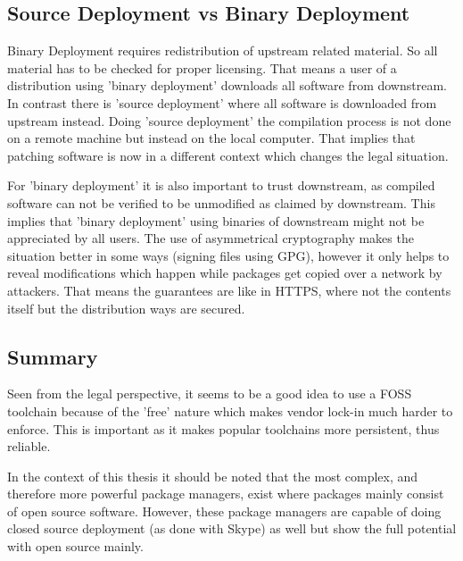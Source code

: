 \documentclass[a4paper,10pt]{article}
\begin{document}
\subsection{Source Deployment vs Binary Deployment}
Binary Deployment requires redistribution of upstream related material. So all material has to be checked for proper licensing. That means a user of a distribution using 'binary deployment' downloads all software from downstream. In contrast there is 'source deployment' where all software is downloaded from upstream instead. Doing 'source deployment' the compilation process is not done on a remote machine but instead on the local computer. That implies that patching software is now in a different context which changes the legal situation.

For 'binary deployment' it is also important to trust downstream, as compiled software can not be verified to be unmodified as claimed by downstream. This implies that 'binary deployment' using binaries of downstream might not be appreciated by all users. The use of asymmetrical cryptography makes the situation better in some ways (signing files using GPG), however it only helps to reveal modifications which happen while packages get copied over a network by attackers. That means the guarantees are like in HTTPS, where not the contents itself but the distribution ways are secured.





\subsection{Summary}
Seen from the legal perspective, it seems to be a good idea to use a FOSS toolchain because of the 'free' nature which makes vendor lock-in much harder to enforce. This is important as it makes popular toolchains more persistent, thus reliable.

In the context of this thesis it should be noted that the most complex, and therefore more powerful package managers, exist where packages mainly consist of open source software. However, these package managers are capable of doing closed source deployment (as done with Skype) as well but show the full potential with open source mainly. 
\end{document}
